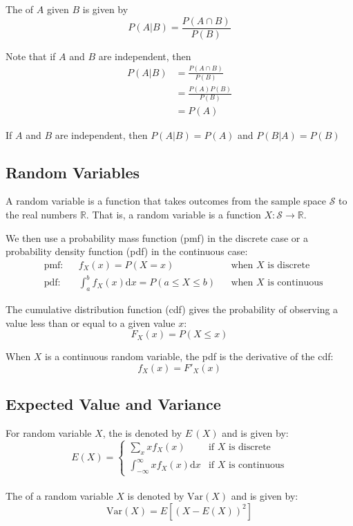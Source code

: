 \documentclass[11pt]{article}
\begin{document}
The  of $A$ given $B$ is given by \[P(A|B) = \frac{P(A \cap B)}{P(B)}\]

\begin{lemma}
    Note that if $A$ and $B$ are independent, then \begin{align*}
        P(A|B) & = \frac{P(A \cap B)}{P(B)} \\
               & = \frac{P(A)P(B)}{P(B)}    \\
               & = P(A)
    \end{align*}
\end{lemma}

\begin{corollary}
    If $A$ and $B$ are independent, then $P(A|B) = P(A)$ and $P(B|A) = P(B)$
\end{corollary}

\subsection{Random Variables}

\begin{definition}
    A random variable is a function that takes outcomes from the sample space $\mathcal{S}$ to the real numbers $\mathbb{R}$. That is, a random variable is a function $X: \mathcal{S} \to \mathbb{R}$.
\end{definition}

We then use a probability mass function (pmf) in the discrete case or a
probability density function (pdf) in the continuous case:
\begin{align*}
     & \text{pmf:} &  & f_X(x) = P(X = x)                                   &  & \text{when } X \text{ is discrete}   \\
     & \text{pdf:} &  & \int_{a}^{b}f_X(x) \mathrm{d}x = P(a \leq X \leq b) &  & \text{when } X \text{ is continuous}
\end{align*}

The cumulative distribution function (cdf) gives the probability of observing a
value less than or equal to a given value $x$: \[F_X(x) = P(X \leq x)\]

When $X$ is a continuous random variable, the pdf is the derivative of the cdf: \[f_X(x) = F'_X(x)\]

\subsection{Expected Value and Variance}
For random variable $X$, the  is denoted by $E \,(X)$ and
is given by:
\[
    E(X) = \begin{cases}
        \sum_{x} x f_X(x)                            & \text{if } X \text{ is discrete}   \\
        \int_{-\infty}^{\infty} x f_X(x) \mathrm{d}x & \text{if } X \text{ is continuous}
    \end{cases}
\]
\\
The  of a random variable $X$ is denoted by $\text{Var}(X)$ and is
given by:
\[
    \text{Var}(X) = E\left[{(X - E(X))}^{2}\right]
\]
\end{document}
